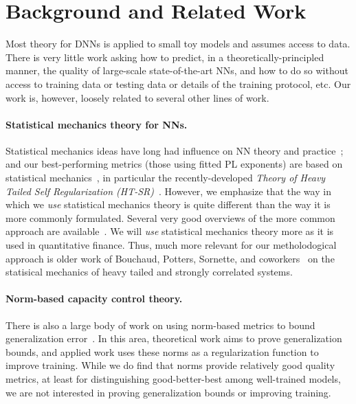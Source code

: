 \section{Background and Related Work}
\label{sxn:background}

Most theory for DNNs is applied to small toy models and assumes access to data.
There is very little work asking how to predict, in a theoretically-principled manner, the quality of large-scale state-of-the-art NNs, and how to do so without access to training data or testing data or details of the training protocol, etc.
Our work is, however, loosely related to several other lines of work.


\paragraph{Statistical mechanics theory for NNs.}

Statistical mechanics ideas have long had influence on NN theory and practice~\cite{EB01_BOOK, MM17_TR, BKPx20}; and 
our best-performing metrics (those using fitted PL exponents) are based on statistical mechanics~\cite{MM17_TR, MM18_TR, MM19_HTSR_ICML, MM19_KDD, MM20_SDM}, in particular the recently-developed \emph{Theory of Heavy Tailed Self Regularization (HT-SR)}~\cite{MM18_TR, MM19_HTSR_ICML, MM20_SDM}.  
However, we emphasize that the way in which we \emph{use} statistical mechanics theory is quite different than the way it is more commonly formulated.
Several very good overviews of the more common approach are available~\cite{EB01_BOOK, BKPx20}.
We will \emph{use} statistical mechanics theory more as it is used in quantitative finance.
Thus, much more relevant for our metholodogical approach is older work of Bouchaud, Potters, Sornette, and coworkers~\cite{BouchaudPotters03, SornetteBook, BP11, bun2017} on the statisical mechanics of heavy tailed and strongly correlated systems.


\paragraph{Norm-based capacity control theory.}

There is also a large body of work on using norm-based metrics to bound generalization error~\cite{NTS15, BFT17_TR, LMBx18_TR}.
In this area, theoretical work aims to prove generalization bounds, and applied work uses these norms as a regularization function to improve training.
While we do find that norms provide relatively good quality metrics, at least for distinguishing good-better-best among well-trained models, we are not interested in proving generalization bounds or improving training.


